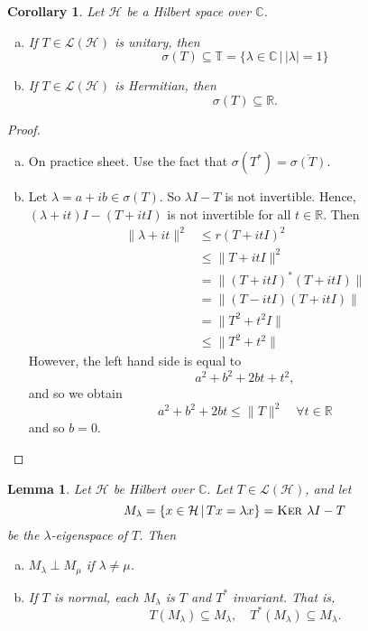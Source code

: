 \documentclass[justified]{tufte-book}
\theoremstyle{plain}%
\newtheorem{lem}[thm]{Lemma}
\newtheorem*{cor}{Corollary}
\theoremstyle{definition}
\theoremstyle{remark}
\newcommand{\given}{ \, | \,}
\newcommand{\R}{\mathbb{R}}
\renewcommand{\C}{\mathbb{C}}
\renewcommand{\ker}{\textsc{Ker\ }}
\begin{document}
\begin{cor}
  Let $\mathcal H$ be a Hilbert space over $\C$.  \begin{enumerate}[(a)]
      \item If $T \in \mathcal L(\mathcal H)$ is unitary, then \[
          \sigma(T) \subseteq \mathbb{T} = \{ \lambda \in \C \given | \lambda | = 1 \}\]
      \item If $T \in \mathcal L(\mathcal H)$ is Hermitian, then \[
          \sigma(T) \subseteq \R.
      \]
  \end{enumerate}
\end{cor}
\begin{proof}{\ }\begin{enumerate}[(a)]
  \item On practice sheet.  Use the fact that $\sigma(T^*) = \overline{\sigma(T)}$.
  \item Let $\lambda = a + ib \in \sigma(T)$.  So $\lambda I - T$ is not invertible.  Hence, $(\lambda + it)I - (T + it I)$ is not invertible for all $t \in \R$. 
  Then \begin{align*}
      \| \lambda + it \|^2    &\leq r(T + itI)^2 \\
                              &\leq \| T + itI \|^2 \\
                              &= \| (T + itI)^* ( T + itI) \| \\
                              &= \| (T - itI)(T + itI) \| \\
                              &= \| T^2 + t^2 I \| \\
                              &\leq \| T^2 + t^2 \|
  \end{align*}  However, the left hand side is equal to \[
      a^2 + b^2 + 2bt + t^2,
  \] and so we obtain \[
      a^2 + b^2 + 2bt \leq \| T \|^2 \quad \forall t \in \R
  \] and so $b = 0$.  
\end{enumerate}
\end{proof}

\begin{lem}
  Let $\mathcal H$ be Hilbert over $\C$.  Let $T \in \mathcal L(\mathcal H)$, and let \[
      M_\lambda = \{ x \in \mathcal H \given Tx = \lambda x \} = \ker \lambda I - T
  \]  be the $\lambda$-eigenspace of $T$.  Then \begin{enumerate}[(a)]
      \item $M_\lambda \perp M_\mu$ if $\lambda \neq \mu$.  
      \item If $T$ is normal, each $M_\lambda$ is $T$ and $T^*$ invariant.  That is, \[
          T(M_\lambda) \subseteq M_\lambda, \quad T^*(M_\lambda) \subseteq M_\lambda.
      \]
  \end{enumerate}
\end{lem}
\end{document}
